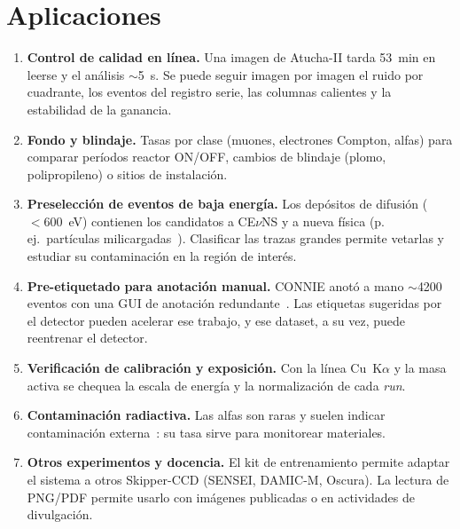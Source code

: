 \documentclass[10pt,a4paper]{article}
\begin{document}
\section{Aplicaciones}
\begin{enumerate}
\item \textbf{Control de calidad en línea.} Una imagen de Atucha-II tarda 53~min en leerse y el análisis
  $\sim$5~s. Se puede seguir imagen por imagen el ruido por cuadrante, los eventos del registro serie, las
  columnas calientes y la estabilidad de la ganancia.
\item \textbf{Fondo y blindaje.} Tasas por clase (muones, electrones Compton, alfas) para comparar
  períodos reactor ON/OFF, cambios de blindaje (plomo, polipropileno) o sitios de instalación.
\item \textbf{Preselección de eventos de baja energía.} Los depósitos de difusión ($<600$~eV) contienen los
  candidatos a CE$\nu$NS y a nueva física (p.\,ej.\ partículas milicargadas~\cite{connie2025}). Clasificar las
  trazas grandes permite vetarlas y estudiar su contaminación en la región de interés.
\item \textbf{Pre-etiquetado para anotación manual.} CONNIE anotó a mano $\sim$4200 eventos con una GUI de
  anotación redundante~\cite{mirthis2026}. Las etiquetas sugeridas por el detector pueden acelerar ese trabajo,
  y ese dataset, a su vez, puede reentrenar el detector.
\item \textbf{Verificación de calibración y exposición.} Con la línea Cu~K$\alpha$ y la masa activa se chequea
  la escala de energía y la normalización de cada \emph{run}.
\item \textbf{Contaminación radiactiva.} Las alfas son raras y suelen indicar contaminación externa~\cite{mirthis2025}:
  su tasa sirve para monitorear materiales.
\item \textbf{Otros experimentos y docencia.} El kit de entrenamiento permite adaptar el sistema a otros
  Skipper-CCD (SENSEI, DAMIC-M, Oscura). La lectura de PNG/PDF permite usarlo con imágenes publicadas o en
  actividades de divulgación.
\end{enumerate}

\end{document}
